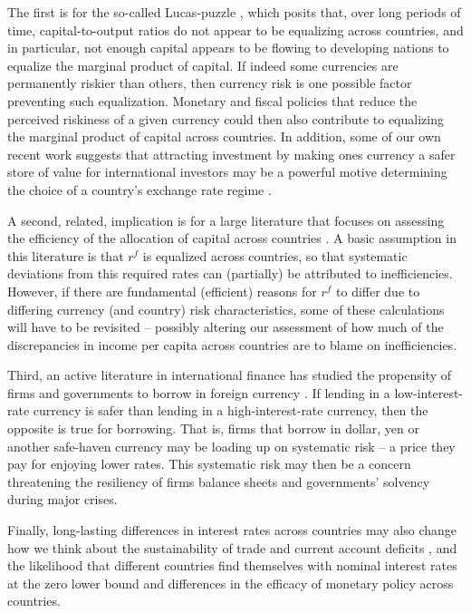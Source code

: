 \documentclass{ar-1col}
\begin{document}
The first is for the so-called Lucas-puzzle \citep{Lucas1990}, which posits that, over long periods of time, capital-to-output ratios do not appear to be equalizing across countries, and in particular, not enough capital appears to be flowing to developing nations to equalize the marginal product of capital. If indeed some currencies are permanently riskier than others, then currency risk is one possible factor preventing such equalization. Monetary and fiscal policies that reduce the perceived riskiness of a given currency could then also contribute to equalizing the marginal product of capital across countries. In addition, some of our own recent work suggests that attracting investment by making ones currency a safer store of value for international investors may be a powerful motive determining the choice of a country's exchange rate regime \citep{HassanMertensZhang2020}.

A second, related, implication is for a large literature that focuses on assessing the efficiency of the allocation of capital across countries \citep{HallJones1997, CaselliFeyrer2007}. A basic assumption in this literature is that $r^f$ is equalized across countries, so that systematic deviations from this required rates can (partially) be attributed to inefficiencies. However, if there are fundamental (efficient) reasons for $r^f$ to differ due to differing currency (and country) risk characteristics, some of these calculations will have to be revisited -- possibly altering our assessment of how much of the discrepancies in income per capita across countries are to blame on inefficiencies.

Third, an active literature in international finance has studied the propensity of firms and governments to borrow in foreign currency \citep{cespedes2004balance, du2016sovereign}. If lending in a low-interest-rate currency is safer than lending in a high-interest-rate currency, then the opposite is true for borrowing. That is, firms that borrow in dollar, yen or another safe-haven currency may be loading up on systematic risk -- a price they pay for enjoying lower rates. This systematic risk may then be a concern threatening the resiliency of firms balance sheets and governments' solvency during major crises.

Finally, long-lasting differences in interest rates across countries may also change how we think about the sustainability of trade and current account deficits \citep{GourinchasRey2007}, and the likelihood that different countries find themselves with nominal interest rates at the zero lower bound and differences in the efficacy of monetary policy across countries.
\end{document}
